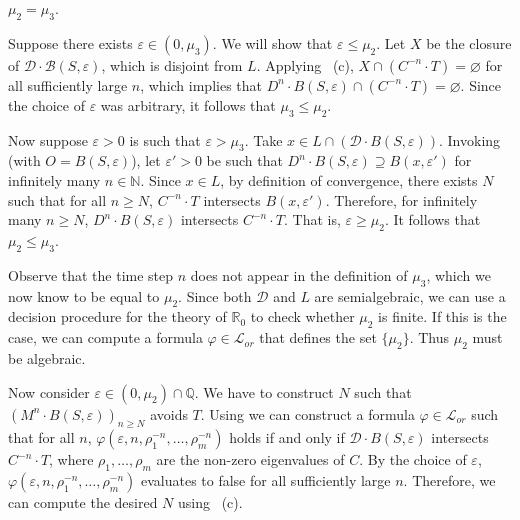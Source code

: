\documentclass[a4paper,UKenglish,cleveref]{lipics-v2021}
\newcommand{\nat}{\mathbb{N}}
\newcommand{\rel}{\mathbb{R}}
\newcommand{\rat}{\mathbb{Q}}
\newcommand{\Bcal}{\mathcal{B}}
\newcommand{\Dcal}{\mathcal{D}}
\newcommand{\Lcal}{\mathcal{L}}
\begin{document}
\begin{claim*}
	$\mu_2 = \mu_3$.
\end{claim*}
\begin{claimproof}
	Suppose there exists $\varepsilon \in (0, \mu_3)$.
	We will show that $\varepsilon \le \mu_2$.
	Let $X$ be the closure of $\Dcal \cdot \Bcal(S, \varepsilon)$, which is disjoint from $L$.
	Applying ~(c), $X \cap (C^{-n} \cdot T)  = \varnothing$ for all sufficiently large $n$, which implies that $D^n \cdot B(S,\varepsilon) \cap  (C^{-n} \cdot T) = \varnothing$. 
	Since the choice of $\varepsilon$ was arbitrary, it follows that $\mu_3 \le \mu_2$.
	
	Now suppose $\varepsilon > 0$ is such that $\varepsilon > \mu_3$.
	Take $x \in L \cap (\Dcal \cdot B(S, \varepsilon))$. 
	Invoking  (with $O = B(S,\varepsilon)$), let $\varepsilon' > 0$ be such that $D^n \cdot B(S,\varepsilon) \supseteq B(x, \varepsilon')$ for infinitely many $n \in \nat$.
	Since $x \in L$, by definition of convergence, there exists $N$ such that for all $n \ge N$, $C^{-n} \cdot T$ intersects $B(x, \varepsilon')$.
	Therefore, for infinitely many $n \ge N$, $D^n \cdot B(S,\varepsilon)$ intersects $C^{-n} \cdot T$.
	That is, $\varepsilon \ge \mu_2$.
	It follows that $\mu_2\le \mu_3$.
\end{claimproof}

Observe that the time step $n$ does not appear in the definition of $\mu_3$, which we now know to be equal to $\mu_2$.
Since both $\Dcal$ and $L$ are semialgebraic, we can use a decision procedure for the theory of $\rel_0$ to check whether $\mu_2$ is finite.
If this is the case, we can compute a formula $\varphi \in \Lcal_{or}$ that defines the set $\{\mu_2\}$.
Thus $\mu_2$ must be algebraic. 

Now consider $\varepsilon \in (0, \mu_2) \cap \rat$. 
We have to construct $N$ such that $(M^n \cdot B(S, \varepsilon))_{n\ge N}$ avoids $T$.
Using  we can construct a formula $\varphi \in \Lcal_{or}$ such that for all $n$, 
$\varphi(\varepsilon, n, \rho_1^{-n}, \ldots, \rho_m^{-n})$ holds if and only if $\Dcal \cdot B(S,\varepsilon)$ intersects $C^{-n} \cdot T$, where $\rho_1,\ldots,\rho_m$ are the non-zero eigenvalues of $C$.
By the choice of $\varepsilon$, $\varphi(\varepsilon, n, \rho_1^{-n}, \ldots, \rho_m^{-n})$  evaluates to false for all sufficiently large $n$.
Therefore, we can compute the desired $N$ using ~(c).
\end{document}
